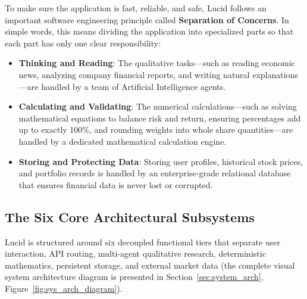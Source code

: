 To make sure the application is fast, reliable, and safe, Lucid follows an important software engineering principle called \textbf{Separation of Concerns}. In simple words, this means dividing the application into specialized parts so that each part has only one clear responsibility:
\begin{itemize}
    \item \textbf{Thinking and Reading}: The qualitative tasks—such as reading economic news, analyzing company financial reports, and writing natural explanations—are handled by a team of Artificial Intelligence agents.
    \item \textbf{Calculating and Validating}: The numerical calculations—such as solving mathematical equations to balance risk and return, ensuring percentages add up to exactly 100\%, and rounding weights into whole share quantities—are handled by a dedicated mathematical calculation engine.
    \item \textbf{Storing and Protecting Data}: Storing user profiles, historical stock prices, and portfolio records is handled by an enterprise-grade relational database that ensures financial data is never lost or corrupted.
\end{itemize}

\subsection{The Six Core Architectural Subsystems}
Lucid is structured around six decoupled functional tiers that separate user interaction, API routing, multi-agent qualitative research, deterministic mathematics, persistent storage, and external market data (the complete visual system architecture diagram is presented in Section~\ref{sec:system_arch}, Figure~\ref{fig:sys_arch_diagram}).

